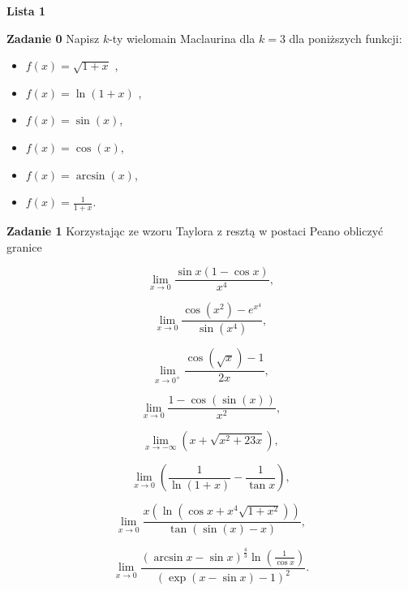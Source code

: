 \documentclass[a4paper,11pt]{article}
\begin{document}
\begin{center}
  {\large\textbf{Lista 1}}
\end{center}

\bigskip

\textbf{Zadanie 0} Napisz $k$-ty wielomain Maclaurina dla $k=3$ dla
poniższych funkcji:

\bigskip

\begin{minipage}{0.49\textwidth}
  \begin{itemize}
    \item $f(x) = \sqrt{1+x} $ ,
    \item $f(x) = \ln(1+x)$ ,
    \item $f(x) = \sin(x)$,
  \end{itemize} 
\end{minipage}
%
\begin{minipage}{0.49\textwidth}
  \begin{itemize}
    \item $f(x) = \cos(x)$,
    \item $f(x) = \arcsin(x)$,
    \item $f(x) = \frac{1}{1+x}$.
  \end{itemize}
\end{minipage}

\bigskip

\textbf{Zadanie 1} Korzystając ze wzoru Taylora z resztą w postaci Peano
obliczyć granice

\begin{minipage}{0.5\textwidth}

  \[
    \lim_{x\to 0} \frac{\sin x (1-\cos x)}{x^4}
  ,\] 

  \[
    \lim_{x\to 0} \frac{\cos(x^2) - e^{x^4}}{\sin(x^4)}
  ,\] 

  \[
    \lim _{x\to 0^+} \frac{\cos(\sqrt{x}) - 1 }{2x}
  ,\] 

  \[
    \lim_{x\to 0} \frac{1-\cos(\sin(x))}{x^2}
  ,\] 
\end{minipage}
\begin{minipage}{0.5\textwidth}

  \[
    \lim_{x \to {-\infty}}\left( x+\sqrt{x^2 + 23x}  \right) 
  ,\] 

  \[
    \lim_{x \to 0} \left( \frac{1}{\ln(1+x)} - \frac{1}{\tan x} \right) 
  ,\]

  \[
    \lim_{x\to 0} \frac{x(\ln(\cos x + x^4
    \sqrt{1+x^2}))}{\tan(\sin(x)-x)}
  ,\]

  \[
    \lim_{x\to 0} \frac{(\arcsin x - \sin x)^{\frac{4}{3}} \ln(\frac{1}{\cos
    x})}{(\exp(x-\sin x) - 1 )^2}
  .\] 
\end{minipage}
\end{document}
